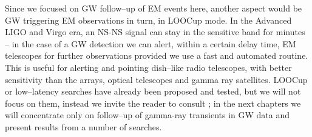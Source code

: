 Since we focused on GW follow--up of EM events here, another aspect would be GW triggering EM observations in turn, in LOOCup mode. In the Advanced LIGO and Virgo era, an NS-NS signal can stay in the sensitive band for minutes -- in the case of a GW detection we can alert, within a certain delay time, EM telescopes for further observations provided we use a fast and automated routine. This is useful for alerting and pointing dish--like radio telescopes, with better sensitivity than the arrays, optical telescopes and gamma ray satellites. LOOCup or low--latency searches have already been proposed and tested, but we will not focus on them, instead we invite the reader to consult \cite{Virgo:2011aa,Mandel:2011au}; in the next chapters we will concentrate only on follow--up of gamma-ray transients in GW data and present results from a number of searches.
